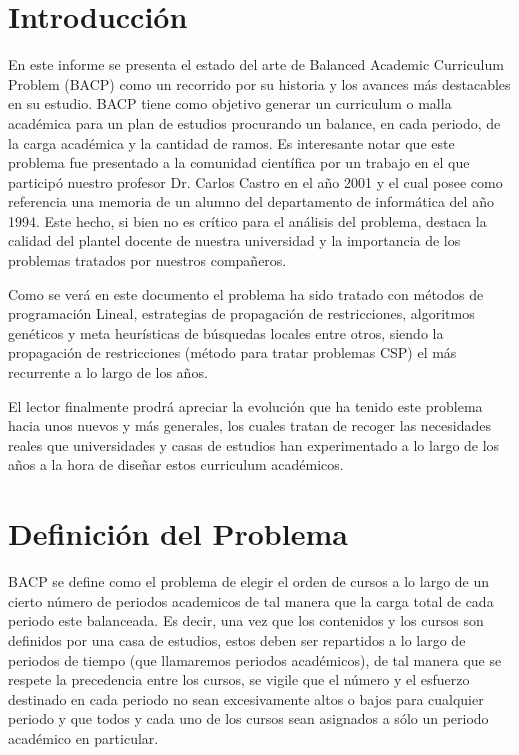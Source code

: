 \documentclass[letter, 10pt]{article}
\begin{document}
\section{Introducción}
En este informe se presenta el estado del arte de Balanced Academic Curriculum
Problem (BACP) como un recorrido por su historia y los avances más destacables
en su estudio.  BACP tiene como objetivo generar un curriculum o malla académica
para un plan de estudios procurando un balance, en cada periodo, de la carga
académica y la cantidad de ramos. Es interesante notar que este problema fue
presentado a la comunidad científica por un trabajo en el que participó nuestro
profesor Dr. Carlos Castro\cite{castro2001variable} en el año 2001 y el cual
posee como referencia una memoria de un alumno del departamento de informática
del año 1994\cite{vergara}. Este hecho, si bien no es crítico para el análisis
del problema, destaca la calidad del plantel docente de nuestra universidad y la
importancia de los problemas tratados por nuestros compañeros.

Como se verá en este documento el problema ha sido tratado con métodos de
programación Lineal, estrategias de propagación de restricciones, algoritmos
genéticos y meta heurísticas de búsquedas locales entre otros, siendo la
propagación de restricciones (método para tratar problemas CSP) el más
recurrente a lo largo de los años.

El lector finalmente prodrá apreciar la evolución que ha tenido este
problema hacia unos nuevos y más generales, los cuales tratan de recoger
las necesidades reales que universidades y casas de estudios han
experimentado a lo largo de los años a la hora de diseñar estos curriculum académicos.


\section{Definición del Problema}
BACP se define como el problema de elegir el orden de cursos a lo largo
de un cierto número de periodos academicos de tal manera que la carga
total de cada periodo este balanceada. Es decir, una vez que los
contenidos y los cursos son definidos por una casa de estudios, estos
deben ser repartidos a lo largo de periodos de tiempo (que llamaremos
periodos académicos), de tal manera que se respete la precedencia entre
los cursos, se vigile que el número y el esfuerzo destinado en cada
periodo no sean excesivamente altos o bajos para cualquier periodo y que
todos y cada uno de los cursos sean asignados a sólo un periodo
académico en particular.
\end{document}
